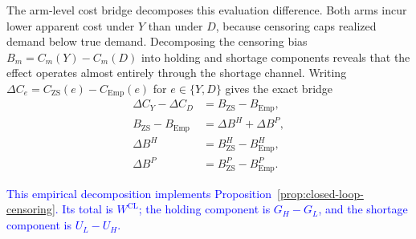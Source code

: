 \documentclass[msom,dblanonrev]{informs4}
\newcommand{\add}[1]{\textcolor{blue}{#1}}
\newcommand{\reduce}[1]{\textcolor{red}{#1}\hspace{0.5em}}
\begin{document}
The arm-level cost bridge decomposes this evaluation difference.
Both arms incur lower apparent cost under $Y$ than under $D$, because censoring caps realized demand below true demand.
Decomposing the censoring bias $B_m = C_m(Y) - C_m(D)$ into holding and shortage components reveals that the effect operates almost entirely through the shortage channel.
Writing $\Delta C_e=C_{\mathrm{ZS}}(e)-C_{\mathrm{Emp}}(e)$ for $e\in\{Y,D\}$ gives the exact bridge
\[
\begin{aligned}
\Delta C_Y-\Delta C_D
&=B_{\mathrm{ZS}}-B_{\mathrm{Emp}},\\
B_{\mathrm{ZS}}-B_{\mathrm{Emp}}
&=\Delta B^H+\Delta B^P,\\
\Delta B^H&=B^H_{\mathrm{ZS}}-B^H_{\mathrm{Emp}},\\
\Delta B^P&=B^P_{\mathrm{ZS}}-B^P_{\mathrm{Emp}}.
\end{aligned}
\]

\add{This empirical decomposition implements Proposition~\ref{prop:closed-loop-censoring}. Its total is $W^{\mathrm{CL}}$; the holding component is $G_H-G_L$, and the shortage component is $U_L-U_H$.}

\begin{table}[ht]
\caption{\reduce{Arm-level dynamic-cost bridge.}\add{Arm-level closed-loop replay cost bridge.} Entries are cell means on the same 11{,}350-cell support. Total cost equals holding plus shortage cost up to numerical precision.}\label{tab:arm-cost-bridge}
\centering\small
{}
\end{table}
\end{document}
